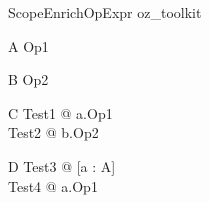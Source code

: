 \begin{zsection}
  \SECTION ScopeEnrichOpExpr \parents oz\_toolkit
\end{zsection}

\begin{class}{A}
  Op1 \sdef [x? : \nat]
\end{class}

\begin{class}{B}
  Op2 
\end{class}

\begin{class}{C}
  Test1 \sdef [a : A] @ a.Op1\\
  Test2 \sdef [b : B] @ b.Op2
\end{class}

\begin{class}{D}
  Test3 \sdef [a : A] @ [a : A]\\
  Test4 \sdef [a : A] @ a.Op1 \land [a : A]
\end{class}
